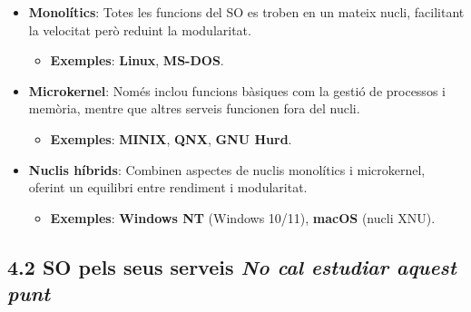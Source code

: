 \documentclass[
  a4paper,
]{article}
\providecommand{\tightlist}{%
  \setlength{\itemsep}{0pt}\setlength{\parskip}{0pt}}
\begin{document}
\begin{itemize}
\tightlist
\item
  \textbf{Monolítics}: Totes les funcions del SO es troben en un mateix
  nucli, facilitant la velocitat però reduint la modularitat.

  \begin{itemize}
  \tightlist
  \item
    \textbf{Exemples}: \textbf{Linux}, \textbf{MS-DOS}.
  \end{itemize}
\item
  \textbf{Microkernel}: Només inclou funcions bàsiques com la gestió de
  processos i memòria, mentre que altres serveis funcionen fora del
  nucli.

  \begin{itemize}
  \tightlist
  \item
    \textbf{Exemples}: \textbf{MINIX}, \textbf{QNX}, \textbf{GNU Hurd}.
  \end{itemize}
\item
  \textbf{Nuclis híbrids}: Combinen aspectes de nuclis monolítics i
  microkernel, oferint un equilibri entre rendiment i modularitat.

  \begin{itemize}
  \tightlist
  \item
    \textbf{Exemples}: \textbf{Windows NT} (Windows 10/11),
    \textbf{macOS} (nucli XNU).
  \end{itemize}
\end{itemize}

\subsection{\texorpdfstring{4.2 SO pels seus serveis \emph{No cal
estudiar aquest
punt}}{4.2 SO pels seus serveis No cal estudiar aquest punt}}\label{so-pels-seus-serveis-no-cal-estudiar-aquest-punt}
\end{document}
